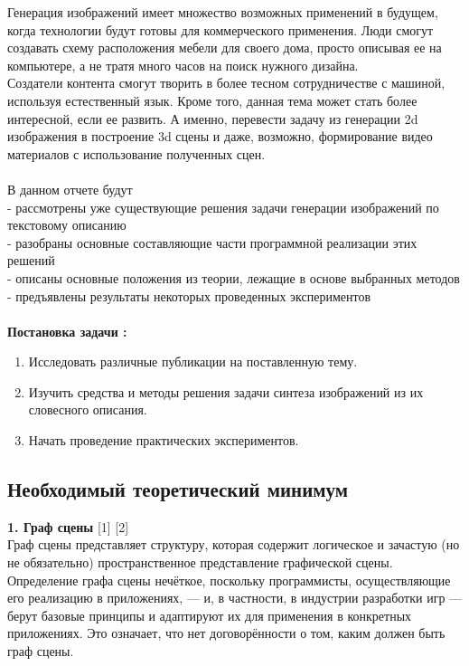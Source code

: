 \documentclass{article}
\begin{document}
    Генерация изображений имеет множество возможных применений в
    будущем, когда технологии будут готовы для коммерческого применения. 
    Люди смогут создавать схему расположения мебели для своего дома, просто описывая ее на компьютере, а не тратя много часов на поиск нужного дизайна.\\ 
    Создатели контента смогут творить в более тесном сотрудничестве с машиной, используя естественный язык.
    Кроме того, данная тема может стать более интересной, если ее развить. А именно, перевести задачу из генерации 2d изображения в построение 3d сцены и даже, возможно, формирование видео материалов с использование полученных сцен.\\ \\
    В данном отчете будут \\
    - рассмотрены уже существующие решения задачи генерации изображений по текстовому описанию\\
    - разобраны основные составляющие части программной реализации этих решений\\
    - описаны основные положения из теории, лежащие в основе выбранных методов\\
    - предъявлены результаты некоторых проведенных экспериментов\\ \\
    \large \textbf{Постановка задачи :}
      \large 
\begin{enumerate} 
\item Исследовать различные публикации на поставленную тему.
\item Изучить средства и методы решения задачи синтеза изображений из их словесного описания.
\item Начать проведение практических экспериментов.\\
\end{enumerate} 
    \newpage
    \begin{center} 
    \section{Необходимый теоретический минимум}
    \end{center} 
      \large \textbf{1. Граф сцены} [1] [2]\\
      Граф сцены представляет структуру, которая содержит логическое и зачастую (но не обязательно) пространственное представление графической сцены. Определение графа сцены нечёткое, поскольку программисты, осуществляющие его реализацию в приложениях, — и, в частности, в индустрии разработки игр — берут базовые принципы и адаптируют их для применения в конкретных приложениях. Это означает, что нет договорённости о том, каким должен быть граф сцены.
\end{document}
